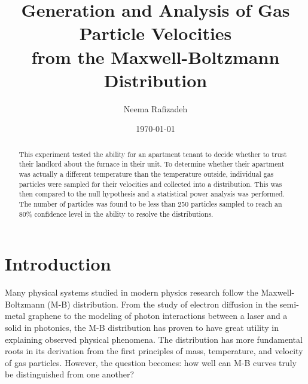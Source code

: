 \documentclass[%
 reprint,
 amsmath,amssymb,
 aps,
]{revtex4-2}
\begin{document}

\title{Generation and Analysis of Gas Particle Velocities \\from the Maxwell-Boltzmann Distribution}%

\author{Neema Rafizadeh}
%

\date{\today}

\begin{abstract}

This experiment tested the ability for an apartment tenant to decide whether to trust their landlord about the furnace in their unit. To determine whether their apartment was actually a different temperature than the temperature outside, individual gas particles were sampled for their velocities and collected into a distribution. This was then compared to the null hypothesis and a statistical power analysis was performed. The number of particles was found to be less than 250 particles sampled to reach an 80\% confidence level in the ability to resolve the distributions. 
\end{abstract}


\maketitle


\section{Introduction \protect\\ }

Many physical systems studied in modern physics research follow the Maxwell-Boltzmann (M-B) distribution. From the study of electron diffusion in the semi-metal graphene to the modeling of photon interactions between a laser and a solid in photonics, the M-B distribution has proven to have great utility in explaining observed physical phenomena. The distribution has more fundamental roots in its derivation from the first principles of mass, temperature, and velocity of gas particles. However, the question becomes: how well can M-B curves truly be distinguished from one another?  
\end{document}
